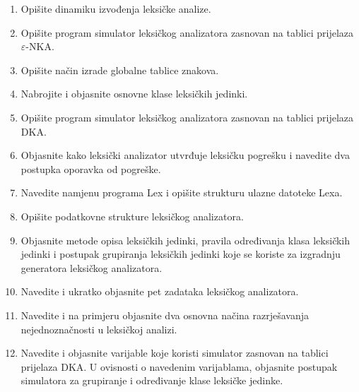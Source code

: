 \documentclass[times, 12pt, utf8]{book}
\begin{document}
\begin{enumerate}[resume]

\item
Opišite dinamiku izvođenja leksičke analize. \cite[str.~52]{udzbenik}

\item 
Opišite program simulator leksičkog analizatora zasnovan na tablici prijelaza \(\varepsilon\)-NKA. \cite[str.~60-62]{udzbenik}

\item 
Opišite način izrade globalne tablice znakova. \cite[str.~50-52]{udzbenik}

\item
Nabrojite i objasnite osnovne klase leksičkih jedinki. \cite[str.~46-49]{udzbenik}

\item
Opišite program simulator leksičkog analizatora zasnovan na tablici prijelaza DKA. \cite[str.~58-60]{udzbenik}

\item
Objasnite kako leksički analizator utvrđuje leksičku pogrešku i navedite dva postupka oporavka od pogreške. \cite[str.~58]{udzbenik}

\item
Navedite namjenu programa Lex i opišite strukturu ulazne datoteke Lexa. \cite[str.~64-70]{udzbenik}

\item
Opišite podatkovne strukture leksičkog analizatora. \cite[str.~49-52]{udzbenik}

\item
Objasnite metode opisa leksičkih jedinki, pravila određivanja klasa leksičkih jedinki i postupak grupiranja leksičkih jedinki koje se koriste za izgradnju generatora leksičkog analizatora. \cite[str.~56-58]{udzbenik}

\item
Navedite i ukratko objasnite pet zadataka leksičkog analizatora. \cite[str.~44-45]{udzbenik}

\item
Navedite i na primjeru objasnite dva osnovna načina razrješavanja nejednoznačnosti u leksičkoj analizi. \cite[str.~63-64]{udzbenik}

\item
Navedite i objasnite varijable koje koristi simulator zasnovan na tablici prijelaza DKA.
U ovisnosti o navedenim varijablama, objasnite postupak simulatora za grupiranje i određivanje klase leksičke jedinke. \cite[str.~58-69]{udzbenik}


\end{enumerate}
\end{document}
